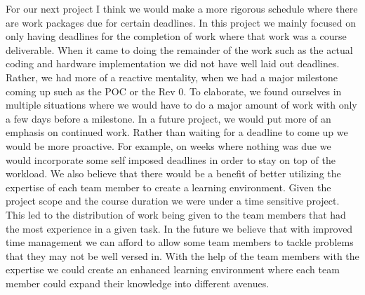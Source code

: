 \documentclass{article}
\begin{document}
For our next project I think we would make a more rigorous schedule where there are work packages due for certain deadlines. In this project we mainly focused on only having deadlines for the completion of work where that work was a course deliverable. When it came to doing the remainder of the work such as the actual coding and hardware implementation we did not have well laid out deadlines. Rather, we had more of a reactive mentality, when we had a major milestone coming up such as the POC or the Rev 0. To elaborate, we found ourselves in multiple situations where we would have to do a major amount of work with only a few days before a milestone. In a future project, we would put more of an emphasis on continued work. Rather than waiting for a deadline to come up we would be more proactive. For example, on weeks where nothing was due we would incorporate some self imposed deadlines in order to stay on top of the workload. 
\newline \newline 
We also believe that there would be a benefit of better utilizing the expertise of each team member to create a learning environment. Given the project scope and the course duration we were under a time sensitive project. This led to the distribution of work being given to the team members that had the most experience in a given task. In the future we believe that with improved time management we can afford to allow some team members to tackle problems that they may not be well versed in. With the help of the team members with the expertise we could create an enhanced learning environment where each team member could expand their knowledge into different avenues. 
\end{document}

